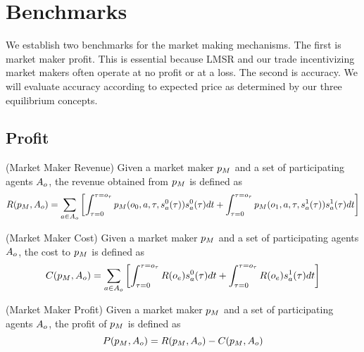 \section{Benchmarks}
We establish two benchmarks for the market making mechanisms. The first is market maker profit. This is essential because LMSR and our trade incentivizing market makers often operate at no profit or at a loss. The second is accuracy. We will evaluate accuracy according to expected price as determined by our three equilibrium concepts.

\subsection{Profit}
  \begin{definition} (Market Maker Revenue)
  \label{def:mmr}
   Given a market maker $p_M$ and a set of participating agents
   $A_o$, the revenue obtained from $p_M$ is defined as
     $$R(p_M, A_o) = 
      \sum_{a\in A_o} \left[
	\int_{\tau = 0}^{\tau = o_\tau} 
	  p_M(o_0,a,\tau, s^{0}_{a}(\tau))s^{0}_{a}(\tau)dt
	  + \int_{\tau = 0}^{\tau = o_\tau} 
	  p_M(o_1,a,\tau, s^{1}_{a}(\tau))s^{1}_{a}(\tau)dt\right]$$
  \end{definition}
  
    \begin{definition} (Market Maker Cost)
  \label{def:mmc}
   Given a market maker $p_M$ and a set of participating agents
   $A_o$, the cost to $p_M$ is defined as
     $$ C(p_M, A_o) =
     \sum_{a\in A_o} \left[
	\int_{\tau = 0}^{\tau = o_\tau} 
	R(o_e)s^{0}_{a}(\tau)dt
	+\int_{\tau = 0}^{\tau = o_\tau} 
	R(o_e)s^{1}_{a}(\tau)dt
	\right]$$
  \end{definition}

      \begin{definition} (Market Maker Profit)
  \label{def:mmf}
   Given a market maker $p_M$ and a set of participating agents
   $A_o$, the profit of $p_M$ is defined as
     $$ P(p_M, A_o) = R(p_M, A_o) 
     - C(p_M, A_o)$$
  \end{definition}
  
